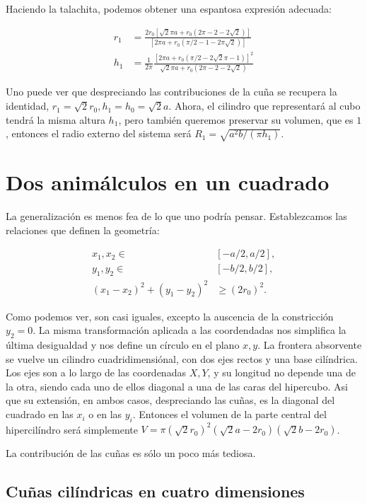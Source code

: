 \documentclass[letterpaperr,12pt]{article}
\begin{document}
Haciendo la talachita, podemos obtener una espantosa expresión adecuada:

\begin{align}
 r_1 & = \frac{2 r_0 [\sqrt{2} \pi a + r_0(2 \pi - 2 - 2 \sqrt{2})]}
 {[2 \pi a + r_0 (\pi/2 - 1 - 2\pi \sqrt{2})] } \\
h_1 & = \frac{1}{2\pi}
\frac{[2\pi a + r_0 (\pi/2 -2 \sqrt{2}\pi-1)]^2 }
{\sqrt{2} \pi a + r_0(2 \pi -2 - 2 \sqrt{2}) }
\end{align}

Uno puede ver que despreciando las contribuciones de la cuña se recupera
la identidad, $r_1= \sqrt{2} r_0, h_1=h_0=\sqrt{2} a $. 
Ahora, el cilindro que representará 
al cubo tendrá la misma altura $h_1$, pero también queremos preservar
su volumen, que es $1$, entonces el radio externo del sistema será
$R_1=\sqrt{a ^2 b /(\pi h_1)}$. 

\section{Dos animálculos en un cuadrado}

La generalización es menos fea de lo que uno podría pensar.
Establezcamos las relaciones que definen la geometría:

\begin{align}
x_1,x_2 \in  & [ -a/2, a/2], \\
y_1, y_2\in & [ -b/2, b/2], \\
(x_1-x_2)^2+(y_1-y_2)^2 & \ge (2 r_0)^2.
\end{align}

Como podemos ver, son casi iguales, excepto la auscencia de la
constricción $y_2=0$. La misma transformación aplicada a 
las coordendadas nos simplifica la última desigualdad
y nos define un círculo en el plano $x,y$. La frontera
absorvente se vuelve un cilindro cuadridimensiónal, con
dos ejes rectos y una base cilíndrica. Los ejes son a lo largo de
las coordenadas $X,Y$, y su longitud no depende una de la otra, siendo
cada uno de ellos diagonal a una de las caras del hipercubo. Asi
que su extensión, en ambos casos, despreciando las cuñas, es la
diagonal del cuadrado en las $x_i$ o en las $y_i$.
Entonces el volumen de la
parte central del hipercilíndro será simplemente
$V=\pi (\sqrt{2} r_0)^2 (\sqrt{2}a-2 r_0) (\sqrt{2}b-2 r_0) $.

La contribución de las cuñas es sólo un poco más tediosa.

\subsection{Cuñas cilíndricas en cuatro dimensiones}
\end{document}
